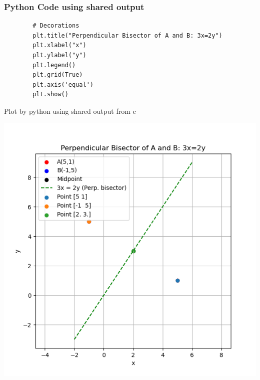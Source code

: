 \documentclass{beamer}
\begin{document}
\begin{frame}[fragile]
	\frametitle{Python Code using shared output}
	\begin{lstlisting}
		# Decorations
		plt.title("Perpendicular Bisector of A and B: 3x=2y")
		plt.xlabel("x")
		plt.ylabel("y")
		plt.legend()
		plt.grid(True)
		plt.axis('equal')
		plt.show()
	\end{lstlisting}
\end{frame}

\begin{frame}{Plot by python using shared output from c}
	\begin{center}
		\includegraphics[width=\linewidth]{figs/fig.png}
	\end{center}
\end{frame}
\end{document}
